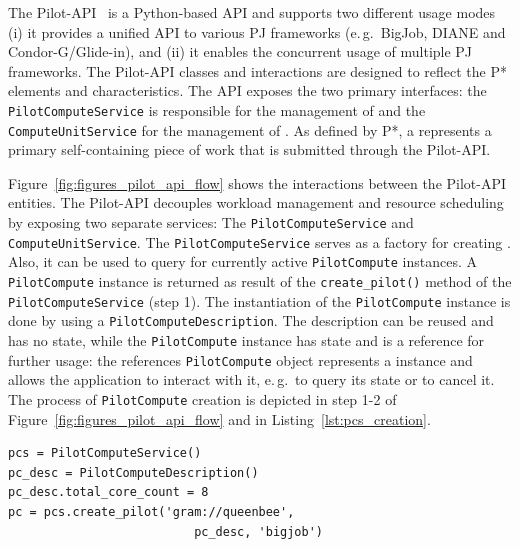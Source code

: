 \documentclass[conference]{IEEEtran}
\begin{document}

The Pilot-API~\cite{pilot_api} is a Python-based API and supports two different 
usage modes (i) it provides a unified API to various PJ frameworks (e.\,g.\ 
BigJob, DIANE and Condor-G/Glide-in), and (ii) it enables the concurrent usage 
of multiple PJ frameworks. The Pilot-API classes and interactions are designed 
to reflect the P* elements and characteristics. 
The API exposes the two primary interfaces: the 
\texttt{Pilot\-Compute\-Service} is responsible for the management of \pilots 
and the \texttt{Compute\-Unit\-Service} for the management of \cus. As defined 
by P*, a \cu represents a primary self-containing piece of work that is 
submitted through the Pilot-API.




Figure~\ref{fig:figures_pilot_api_flow} shows the interactions between the
Pilot-API entities. The Pilot-API decouples
workload management and resource scheduling by exposing two separate services: 
The \texttt{Pilot\-Compute\-Service} and
\texttt{Compute\-Unit\-Service}. 
The \texttt{Pilot\-Compute\-Service} serves as a factory for creating \pilots. 
Also, it can be used to query for currently
active \texttt{Pilot\-Compute} instan\-ces.
A \texttt{Pilot\-Compute} instance is returned as result of the
\texttt{create\_pilot()} method of the \texttt{Pi\-lot\-Compute\-Service} (step 1).
The instantiation of the
\texttt{Pilot\-Compute} instance is done by using a
\texttt{Pilot\-ComputeDescription}. The description can be reused and has no
state, while the \texttt{Pilot\-Compute} instance has state and is a reference
for further usage:
the references \texttt{Pilot\-Compute} object represents a \pilot instance and allows the 
application to interact with it, e.\,g.\ to query its state or to cancel 
it. The process of \texttt{Pilot\-Compute} creation is depicted in step 1-2 of 
Figure~\ref{fig:figures_pilot_api_flow} and in Listing~\ref{lst:pcs_creation}.\\


\lstset{
language=Python,
frame=single,
captionpos=b,
stringstyle=\ttfamily,
basicstyle=\scriptsize\ttfamily
}

\begin{minipage}{0.45 \textwidth}
\begin{lstlisting}[caption={\I{Creation of a \T{PilotCompute} instance using a \T{Pi\-lot\-Compute\-Description}.}}, label={lst:pcs_creation}]
pcs = PilotComputeService()
pc_desc = PilotComputeDescription()
pc_desc.total_core_count = 8
pc = pcs.create_pilot('gram://queenbee', 
                          pc_desc, 'bigjob')
\end{lstlisting}
\end{minipage}
\end{document}
